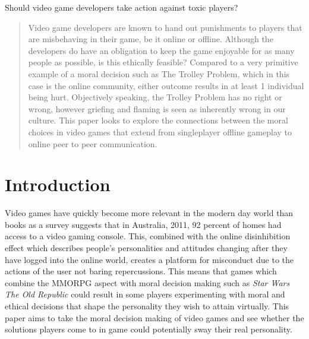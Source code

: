 \documentclass[12pt]{article}
\begin{document}
\maketitle
Should video game developers take action against toxic players?

\begin{abstract}
Video game developers are known to hand out punishments to players that are misbehaving in their game, be it online or offline. Although the developers do have an obligation to keep the game enjoyable for as many people as possible, is this ethically feasible? Compared to a very primitive example of a moral decision such as The Trolley Problem, which in this case is the online community, either outcome results in at least 1 individual being hurt. Objectively speaking, the Trolley Problem has no right or wrong, however griefing and flaming is seen as inherently wrong in our culture. This paper looks to explore the connections between the moral choices in video games that extend from singleplayer offline gameplay to online peer to peer communication.
\end{abstract}


\section{Introduction}
Video games have quickly become more relevant in the modern day world than books as a survey suggests that in Australia, 2011, 92 percent of homes had access to a video gaming console\cite{Martin:2011:PGE:2071536.2071566}. This, combined with the online disinhibition effect which describes people's personalities and attitudes changing after they have logged into the online world\cite{Zim}, creates a platform for misconduct due to the actions of the user not baring repercussions. This means that games which combine the MMORPG aspect with moral decision making such as \textit{Star Wars The Old Republic} could result in some players experimenting with moral and ethical decisions that shape the personality they wish to attain virtually. This paper aims to take the moral decision making of video games and see whether the solutions players come to in game could potentially sway their real personality.
\end{document}
